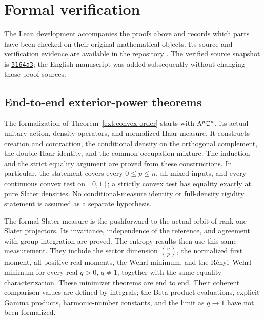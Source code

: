 \section{Formal verification}
\label{sec:formalization}

The Lean development accompanies the proofs above and records which parts
have been checked on their original mathematical objects. Its source and
verification evidence are available in the repository
\cite{repository2026}. The verified source snapshot is
\href{https://github.com/veridiscoverLab/fermionic-coherent-lean/tree/3164a3243fcc6cd675fa8a7493282a1f650a16d8}{\texttt{3164a3}};
the English manuscript was added subsequently without changing those proof
sources.

\subsection{End-to-end exterior-power theorems}

The formalization of Theorem~\ref{ext:convex-order} starts with
$\Lambda^p\mathbb C^n$, its actual unitary action, density operators, and normalized
Haar measure. It constructs creation and contraction, the conditional
density on the orthogonal complement, the double-Haar identity, and the
common occupation mixture. The induction and the strict equality argument
are proved from these constructions. In particular, the statement covers
every $0\le p\le n$, all mixed inputs, and every continuous convex test on
$[0,1]$; a strictly convex test has equality exactly at pure Slater
densities. No conditional-measure identity or full-density rigidity
statement is assumed as a separate hypothesis.

The formal Slater measure is the pushforward to the actual orbit of
rank-one Slater projectors. Its invariance, independence of the reference,
and agreement with group integration are proved. The entropy results then
use this same measurement. They include the sector dimension $\binom np$,
the normalized first moment, all positive real moments, the Wehrl minimum,
and the R\'enyi--Wehrl minimum for every real $q>0$, $q\ne1$, together with
the same equality characterization. These minimizer theorems are end to
end. Their coherent comparison values are defined by integrals; the
Beta-product evaluations, explicit Gamma products, harmonic-number
constants, and the limit as $q\to1$ have not been formalized.

